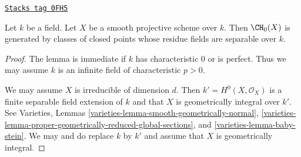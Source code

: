 \begin{lemma}
\label{weil-lemma-generated-by-separable}
\href{https://stacks.math.columbia.edu/tag/0FH5}{\texttt{Stacks tag 0FH5}}

Let $k$ be a field. Let $X$ be a smooth projective scheme over $k$.
Then $\CH_0(X)$ is generated by classes of closed points whose residue
fields are separable over $k$.
\end{lemma}

\begin{proof}
The lemma is immediate if $k$ has characteristic $0$ or is perfect.
Thus we may assume $k$ is an infinite field of characteristic $p > 0$.

\medskip\noindent
We may assume $X$ is irreducible of dimension $d$.
Then $k' = H^0(X, \mathcal{O}_X)$ is a finite separable field
extension of $k$ and that $X$ is geometrically integral over $k'$.
See Varieties, Lemmas \ref{varieties-lemma-smooth-geometrically-normal},
\ref{varieties-lemma-proper-geometrically-reduced-global-sections}, and
\ref{varieties-lemma-baby-stein}. We may and do replace $k$ by $k'$
and assume that $X$ is geometrically integral.


\end{proof}
